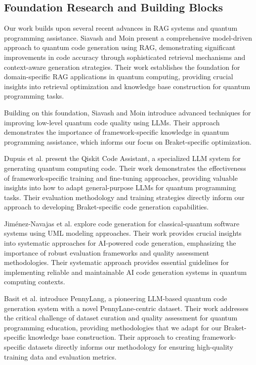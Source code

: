 \documentclass[runningheads]{llncs}
\begin{document}
\subsection{Foundation Research and Building Blocks}
Our work builds upon several recent advances in RAG systems and quantum programming assistance. Siavash and Moin \cite{siavash2025modeldrivenquantumcodegeneration} present a comprehensive model-driven approach to quantum code generation using RAG, demonstrating significant improvements in code accuracy through sophisticated retrieval mechanisms and context-aware generation strategies. Their work establishes the foundation for domain-specific RAG applications in quantum computing, providing crucial insights into retrieval optimization and knowledge base construction for quantum programming tasks.

Building on this foundation, Siavash and Moin \cite{siavash2025llmpoweredquantumcodetranspilation} introduce advanced techniques for improving low-level quantum code quality using LLMs. Their approach demonstrates the importance of framework-specific knowledge in quantum programming assistance, which informs our focus on Braket-specific optimization.

Dupuis et al. \cite{10691762} present the Qiskit Code Assistant, a specialized LLM system for generating quantum computing code. Their work demonstrates the effectiveness of framework-specific training and fine-tuning approaches, providing valuable insights into how to adapt general-purpose LLMs for quantum programming tasks. Their evaluation methodology and training strategies directly inform our approach to developing Braket-specific code generation capabilities.

Jiménez-Navajas et al. \cite{jimenez2025codegeneration} explore code generation for classical-quantum software systems using UML modeling approaches. Their work provides crucial insights into systematic approaches for AI-powered code generation, emphasizing the importance of robust evaluation frameworks and quality assessment methodologies. Their systematic approach provides essential guidelines for implementing reliable and maintainable AI code generation systems in quantum computing contexts.

Basit et al. \cite{basit2025pennylangpioneeringllmbasedquantum} introduce PennyLang, a pioneering LLM-based quantum code generation system with a novel PennyLane-centric dataset. Their work addresses the critical challenge of dataset curation and quality assessment for quantum programming education, providing methodologies that we adapt for our Braket-specific knowledge base construction. Their approach to creating framework-specific datasets directly informs our methodology for ensuring high-quality training data and evaluation metrics.
\end{document}
